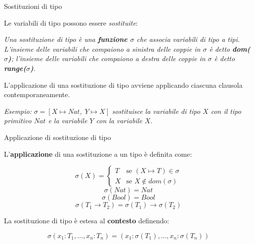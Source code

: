 \documentclass{beamer}
\begin{document}

\begin{tframe}{Sostituzioni di tipo}

Le variabili di tipo possono essere \emph{sostituite}:

\vspace{0.2cm}

\begin{definition}
\textit{Una \emph{sostituzione di tipo} è una \textbf{funzione $\sigma$} che associa variabili di tipo a tipi. L'insieme delle variabili che compaiono a sinistra delle coppie in $\sigma$ è detto \textbf{dom($\sigma$)}; l'insieme delle variabili che compaiono a destra delle coppie in $\sigma$ è detto \textbf{range($\sigma$)}}.
\end{definition}
\vspace{0.2cm}

L'applicazione di una sostituzione di tipo avviene applicando ciascuna clausola contemporaneamente.

\vspace{0.5cm}

\textit{Esempio:} $\sigma = [X \mapsto Nat, \; Y \mapsto X]$
\emph{sostituisce la variabile di tipo $X$ con il tipo primitivo $Nat$ e la variabile $Y$ con la variabile $X$}.
\end{tframe}


\begin{tframe}{Applicazione di sostituzione di tipo}

L'\textbf{applicazione} di una sostituzione a un tipo è definita come:

$$\sigma(X) = \left\{
\begin{array}{ll}
 T & \mbox{se } (X \mapsto T) \in \sigma \\
 X & \mbox{se } X \not\in dom(\sigma)
\end{array}
\right.$$
$$\sigma(Nat) = Nat$$
$$\sigma(Bool) = Bool$$
$$\sigma(T_1 \rightarrow T_2) = \sigma(T_1) \rightarrow \sigma(T_2)$$

\vspace{0.3cm}
La sostituzione di tipo è estesa al \textbf{contesto} definendo:

$$\sigma(x_1: T_1, \ldots, x_n:T_n) = (x_1:\sigma(T_1), \ldots, x_n:\sigma(T_n))$$
\end{tframe}

\end{document}
